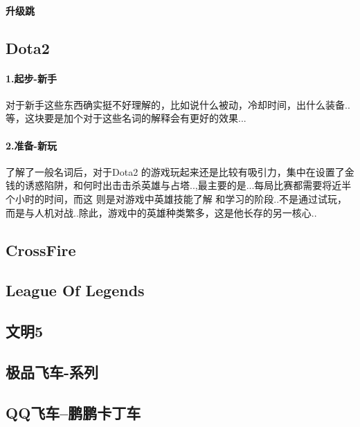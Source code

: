 \documentclass[UTF8,a4paper,8pt]{ctexart}
\begin{document}
		\paragraph{升级跳}
	
	\subsection{Dota2}
		\paragraph{1.起步-新手} 对于新手这些东西确实挺不好理解的，比如说什么被动，冷却时间，出什么装备..等，这块要是加个对于这些名词的解释会有更好的效果...
		
		\paragraph{2.准备-新玩} 了解了一般名词后，对于Dota2 的游戏玩起来还是比较有吸引力，集中在设置了金钱的诱惑陷阱，和何时出击击杀英雄与占塔..,最主要的是...每局比赛都需要将近半个小时的时间，而这 则是对游戏中英雄技能了解 和学习的阶段..不是通过试玩，而是与人机对战..除此，游戏中的英雄种类繁多，这是他长存的另一核心..
	
	\subsection{CrossFire}
	
	\subsection{League Of Legends}
	
	\subsection{文明5}	
    
    \subsection{极品飞车-系列} 
     
    \subsection{QQ飞车--鹏鹏卡丁车}
    
    
    
    
\end{document}
